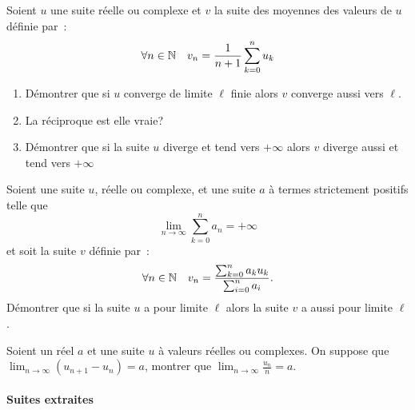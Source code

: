 \begin{exercice}
    Soient \(u\) une suite réelle ou complexe et \(v\) la suite des moyennes des valeurs de \(u\) définie par~:
    \[ \forall n \in \mathbb{N} \quad v_n = \frac{1}{n+1}\sum_{k=0}^n u_k \]
    \begin{enumerate}
        \item Démontrer que si \(u\) converge de limite \(\ell\) finie alors \(v\) converge aussi vers \(\ell\).
        \item La réciproque est elle vraie?
        \item Démontrer que si la suite \(u\) diverge et tend vers \(+\infty\) alors \(v\) diverge aussi et tend vers \(+\infty\)
    \end{enumerate}    
\end{exercice}
\begin{exercice}
    Soient une suite \(u\), réelle ou complexe, et une suite \(a\) à termes strictement positifs telle que \[\lim_{n \to \infty} \sum_{k=0}^n a_n = +\infty\] et soit la suite \(v\) définie par~:
    \[\forall n \in \mathbb{N} \quad v_n = \frac{\sum_{k=0}^n a_k u_k}{\sum_{i=0}^n a_i}.\]
    Démontrer que si la suite \(u\) a pour limite \(\ell\) alors la suite \(v\) a aussi pour limite \(\ell\).
\end{exercice}
\begin{exercice}
    Soient un réel \(a\) et une suite \(u\) à valeurs réelles ou complexes. On suppose que \(\lim_{n\to\infty} (u_{n+1}-u_n) = a\), montrer que \(\lim_{n\to\infty} \frac{u_n}{n} = a\).
\end{exercice}
\paragraph{Suites extraites}
~~

